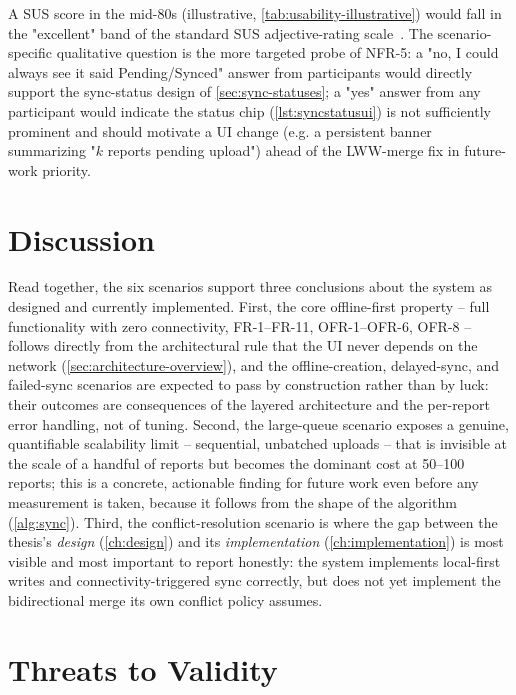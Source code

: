 A SUS score in the mid-80s (illustrative, \cref{tab:usability-illustrative})
would fall in the "excellent" band of the standard SUS adjective-rating
scale~\cite{bangor2009sus}. The scenario-specific qualitative question is
the more targeted probe of NFR-5: a "no, I could always see it said
Pending/Synced" answer from participants would directly support the
sync-status design of \cref{sec:sync-statuses}; a "yes" answer from any
participant would indicate the status chip (\cref{lst:syncstatusui}) is
not sufficiently prominent and should motivate a UI change (e.g. a
persistent banner summarizing "$k$ reports pending upload") ahead of the
LWW-merge fix in future-work priority.

\section{Discussion}
\label{sec:eval-discussion}

Read together, the six scenarios support three conclusions about the
system as designed and currently implemented. First, the core
offline-first property -- full functionality with zero connectivity,
FR-1--FR-11, OFR-1--OFR-6, OFR-8 -- follows directly from the
architectural rule that the UI never depends on the network
(\cref{sec:architecture-overview}), and the offline-creation, delayed-sync,
and failed-sync scenarios are expected to pass by construction rather than
by luck: their outcomes are consequences of the layered architecture and
the per-report error handling, not of tuning. Second, the large-queue
scenario exposes a genuine, quantifiable scalability limit -- sequential,
unbatched uploads -- that is invisible at the scale of a handful of
reports but becomes the dominant cost at 50--100 reports; this is a
concrete, actionable finding for future work even before any measurement
is taken, because it follows from the shape of the algorithm
(\cref{alg:sync}). Third, the conflict-resolution scenario is where the
gap between the thesis's \emph{design} (\cref{ch:design}) and its
\emph{implementation} (\cref{ch:implementation}) is most visible and most
important to report honestly: the system implements local-first writes and
connectivity-triggered sync correctly, but does not yet implement the
bidirectional merge its own conflict policy assumes.

\section{Threats to Validity}
\label{sec:threats}

